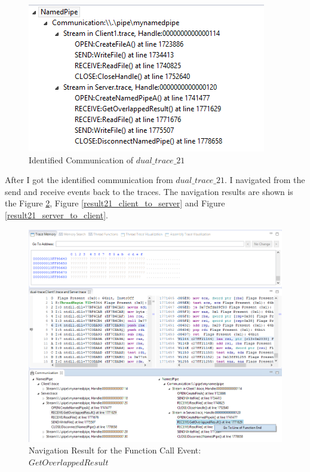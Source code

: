 \begin{figure}[H]
\centerline{\includegraphics{Figures/result21_communications}}
 \caption{Identified Communication of $dual\_trace\_21$}
\label{result21_communications}
\end{figure}

After I got the identified communication from $dual\_trace\_21$. I navigated from the send and receive events back to the traces. The navigation results are shown is the Figure \ref{result21_server_readnull},  Figure \ref{result21_client_to_server} and Figure \ref{result21_server_to_client}.

\begin{figure}[H]
\centerline{\includegraphics[scale=0.35]{Figures/result21_server_readnull}}
 \caption{Navigation Result for the Function Call Event: $GetOverlappedResult$}
\label{result21_server_readnull}
\end{figure}

